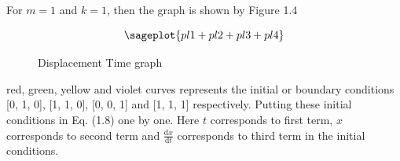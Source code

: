 For $m=1$ and $k=1$, then the graph is shown by Figure 1.4
\begin{figure}[h!]
$$\sageplot{pl1+pl2+pl3+pl4}$$
\caption{Displacement Time graph}
\end{figure}

red, green, yellow and violet curves represents the initial or boundary conditions [0, 1, 0], [1, 1, 0], [0, 0, 1] and [1, 1, 1] respectively. Putting these initial conditions in Eq. (1.8) one by one. Here $t$ corresponds to first term, $x$ corresponds to second term and $\frac{\mathrm{d}x}{\mathrm{d}t}$ corresponds to third term in the initial conditions.
